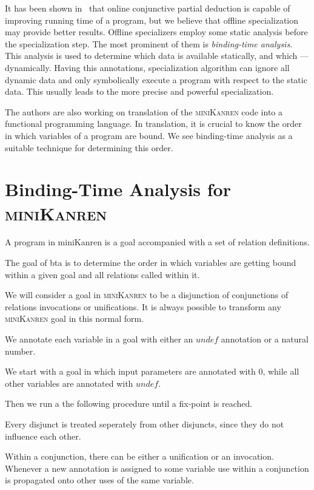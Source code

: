 \documentclass[submission,copyright,creativecommons]{eptcs}
\newcommand{\miniKanren}{\textsc{miniKanren}}
\begin{document}
It has been shown in~\cite{lozov2019relational} that online conjunctive partial deduction is capable of improving running time of a program, but we believe that offline specialization may provide better results.
Offline specializers employ some static analysis before the specialization step.
The most prominent of them is \emph{binding-time analysis}.
This analysis is used to determine which data is available statically, and which --- dynamically.
Having this annotations, specialization algorithm can ignore all dynamic data and only symbolically execute a program with respect to the static data.
This usually leads to the more precise and powerful specialization.

The authors are also working on translation of the \miniKanren{} code into a functional programming language.
In translation, it is crucial to know the order in which variables of a program are bound.
We see binding-time analysis as a suitable technique for determining this order.


\section{Binding-Time Analysis for \miniKanren{}}

A program in miniKanren is a goal accompanied with a set of relation definitions.

The goal of bta is to determine the order in which variables are getting bound within a given goal and all relations called within it.

We will consider a goal in \miniKanren{} to be a disjunction of conjunctions of relations invocations or unifications.
It is always possible to transform any \miniKanren{} goal in this normal form.

We annotate each variable in a goal with either an $undef$ annotation or a natural number.

We start with a goal in which input parameters are annotated with $0$, while all other variables are annotated with $undef$.

Then we run a the following procedure until a fix-point is reached.

Every disjunct is treated seperately from other disjuncts, since they do not influence each other.

Within a conjunction, there can be either a unification or an invocation.
Whenever a new annotation is assigned to some variable use within a conjunction is propagated onto other uses of the same variable.
\end{document}
